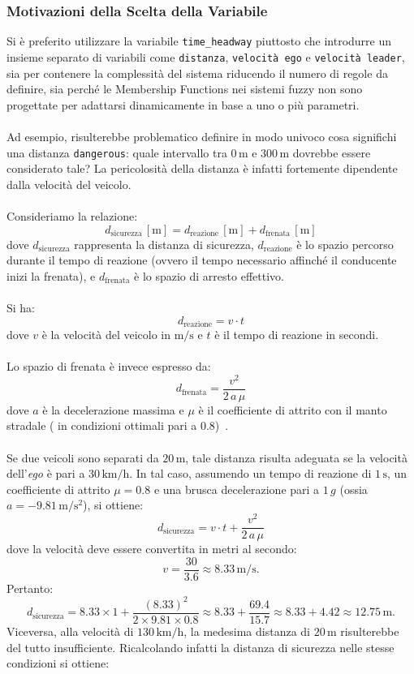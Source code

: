 \subsubsection{Motivazioni della Scelta della Variabile} 
Si è preferito utilizzare la variabile \texttt{time\_headway} piuttosto che introdurre un insieme separato di variabili come 
\texttt{distanza}, \texttt{velocità ego} e \texttt{velocità leader}, sia per contenere la complessità del sistema riducendo 
il numero di regole da definire, sia perché le Membership Functions nei sistemi fuzzy non sono progettate per adattarsi 
dinamicamente in base a uno o più parametri.
\\\\
Ad esempio, risulterebbe problematico definire in modo univoco cosa significhi una distanza \texttt{dangerous}: quale intervallo 
tra \(0\,\mathrm{m}\) e \(300\,\mathrm{m}\) dovrebbe essere considerato tale? La pericolosità della distanza è infatti fortemente 
dipendente dalla velocità del veicolo.
\\\\
Consideriamo la relazione:
\[
d_{\mathrm{sicurezza}}\,[\mathrm{m}] = d_{\mathrm{reazione}}\,[\mathrm{m}] + d_{\mathrm{frenata}}\,[\mathrm{m}]
\]
dove \(d_{\mathrm{sicurezza}}\) rappresenta la distanza di sicurezza, \(d_{\mathrm{reazione}}\) è lo spazio percorso durante il tempo di reazione (ovvero il tempo necessario affinché il conducente inizi la frenata), e \(d_{\mathrm{frenata}}\) è lo spazio di arresto effettivo.
\\\\
Si ha:
\[
d_{\mathrm{reazione}} = v \cdot t
\]
dove \(v\) è la velocità del veicolo in \(\mathrm{m/s}\) e \(t\) è il tempo di reazione in secondi.
\\\\
Lo spazio di frenata è invece espresso da:
\[
d_{\mathrm{frenata}} = \frac{v^2}{2\,a\,\mu}
\]
dove \(a\) è la decelerazione massima e \(\mu\) è il coefficiente di attrito con il manto stradale (
in condizioni ottimali pari a 0.8)~\cite{distanza_di_sicurezza_youmath}.
\\\\
Se due veicoli sono separati da \(20\,\mathrm{m}\), tale distanza risulta adeguata se la velocità 
dell'\emph{ego} è pari a \(30\,\mathrm{km/h}\). In tal caso, assumendo un tempo di reazione di \(1\,\mathrm{s}\), 
un coefficiente di attrito \(\mu=0.8\) e una brusca decelerazione pari a \(1\,g\) (ossia \(a = -9.81\,\mathrm{m/s^2}\)), si ottiene:
\[
d_{\mathrm{sicurezza}} = v \cdot t + \frac{v^2}{2\,a\,\mu}
\]
dove la velocità deve essere convertita in metri al secondo:
\[
v = \frac{30}{3.6} \approx 8.33\,\mathrm{m/s}.
\]
Pertanto:
\[
d_{\mathrm{sicurezza}} = 8.33 \times 1 + \frac{(8.33)^2}{2 \times 9.81 \times 0.8} \approx 8.33 + \frac{69.4}{15.7} \approx 8.33 + 4.42 \approx 12.75\,\mathrm{m}.
\]
Viceversa, alla velocità di \(130\,\mathrm{km/h}\), la medesima distanza di \(20\,\mathrm{m}\) risulterebbe del tutto insufficiente. 
Ricalcolando infatti la distanza di sicurezza nelle stesse condizioni si ottiene:

